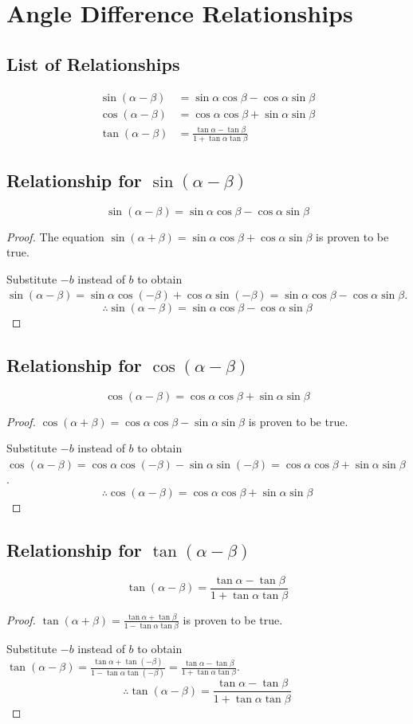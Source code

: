 \documentclass{article}
\begin{document}
\section{Angle Difference Relationships}
\subsection{List of Relationships}
\begin{align*}
    \sin(\alpha-\beta)&=\sin\alpha\cos\beta-\cos\alpha\sin\beta \\
    \cos(\alpha-\beta)&=\cos\alpha\cos\beta+\sin\alpha\sin\beta \\
    \tan(\alpha-\beta)&=\frac{\tan\alpha-\tan\beta}{1+\tan\alpha\tan\beta}
\end{align*}

\subsection{Relationship for $\sin(\alpha-\beta)$}
\[
\sin(\alpha-\beta)=\sin\alpha\cos\beta-\cos\alpha\sin\beta
\]
\begin{proof}
The equation $\sin(\alpha + \beta) =
\sin\alpha \cos\beta + \cos\alpha\sin\beta$
is proven to be true.

Substitute $-b$ instead of $b$ to obtain
$\sin(\alpha - \beta) = \sin\alpha \cos(-\beta) +
\cos\alpha \sin(-\beta) = \sin\alpha \cos\beta -
\cos\alpha\sin\beta$.
\[
\therefore \sin(\alpha - \beta)
= \sin\alpha \cos\beta - \cos\alpha\sin\beta
\]
\end{proof}

\subsection{Relationship for $\cos(\alpha-\beta)$}
\[
\cos(\alpha-\beta)=\cos\alpha\cos\beta+\sin\alpha\sin\beta
\]
\begin{proof}
$\cos(\alpha + \beta) = \cos\alpha \cos\beta -
\sin\alpha\sin\beta$ is proven to be true.

Substitute $-b$ instead of $b$ to obtain
$\cos(\alpha - \beta) = \cos\alpha \cos(-\beta) -
\sin\alpha \sin(-\beta) = \cos\alpha \cos\beta +
\sin\alpha\sin\beta$.
\[
\therefore \cos(\alpha - \beta)
= \cos\alpha \cos\beta + \sin\alpha\sin\beta
\]
\end{proof}

\subsection{Relationship for $\tan(\alpha-\beta)$}
\[
\tan(\alpha-\beta)=\frac{\tan\alpha-\tan\beta}{1+\tan\alpha\tan\beta}
\]
\begin{proof}
$\tan(\alpha + \beta) =
\frac{\tan\alpha + \tan\beta}{1 - \tan\alpha \tan\beta}$
is proven to be true.

Substitute $-b$ instead of $b$ to obtain
$\tan(\alpha - \beta)
= \frac{\tan\alpha + \tan(-\beta)}{1-\tan\alpha \tan(-\beta)}
= \frac{\tan\alpha - \tan\beta}{1 + \tan\alpha \tan\beta}$.
\[
\therefore
\tan(\alpha - \beta)
= \frac{\tan\alpha - \tan\beta}{1 + \tan\alpha \tan\beta}
\]
\end{proof}
\end{document}
